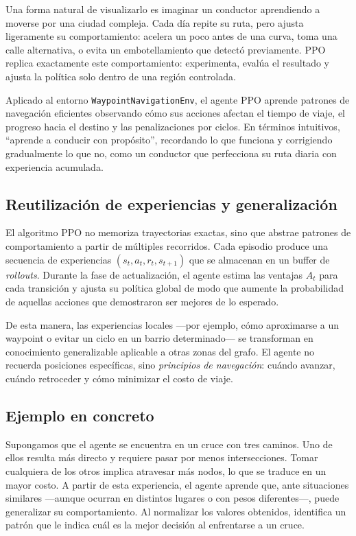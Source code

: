 \documentclass[11pt,a4paper]{article}
\begin{document}
Una forma natural de visualizarlo es imaginar un conductor aprendiendo a moverse por una ciudad compleja. Cada día repite su ruta, pero ajusta ligeramente su comportamiento: acelera un poco antes de una curva, toma una calle alternativa, o evita un embotellamiento que detectó previamente. PPO replica exactamente este comportamiento: experimenta, evalúa el resultado y ajusta la política solo dentro de una región controlada. 

Aplicado al entorno \texttt{WaypointNavigationEnv}, el agente PPO aprende patrones de navegación eficientes observando cómo sus acciones afectan el tiempo de viaje, el progreso hacia el destino y las penalizaciones por ciclos. En términos intuitivos, “aprende a conducir con propósito”, recordando lo que funciona y corrigiendo gradualmente lo que no, como un conductor que perfecciona su ruta diaria con experiencia acumulada.

\subsection{Reutilización de experiencias y generalización}

El algoritmo PPO no memoriza trayectorias exactas, sino que abstrae patrones de comportamiento a partir de múltiples recorridos. Cada episodio produce una secuencia de experiencias $(s_t, a_t, r_t, s_{t+1})$ que se almacenan en un buffer de \textit{rollouts}. Durante la fase de actualización, el agente estima las ventajas $\hat{A}_t$ para cada transición y ajusta su política global de modo que aumente la probabilidad de aquellas acciones que demostraron ser mejores de lo esperado.

De esta manera, las experiencias locales —por ejemplo, cómo aproximarse a un waypoint o evitar un ciclo en un barrio determinado— se transforman en conocimiento generalizable aplicable a otras zonas del grafo. El agente no recuerda posiciones específicas, sino \textit{principios de navegación}: cuándo avanzar, cuándo retroceder y cómo minimizar el costo de viaje. 

\subsection{Ejemplo en concreto}
Supongamos que el agente se encuentra en un cruce con tres caminos. Uno de ellos resulta más directo y requiere pasar por menos intersecciones. Tomar cualquiera de los otros implica atravesar más nodos, lo que se traduce en un mayor costo. A partir de esta experiencia, el agente aprende que, ante situaciones similares —aunque ocurran en distintos lugares o con pesos diferentes—, puede generalizar su comportamiento. Al normalizar los valores obtenidos, identifica un patrón que le indica cuál es la mejor decisión al enfrentarse a un cruce.
\end{document}
